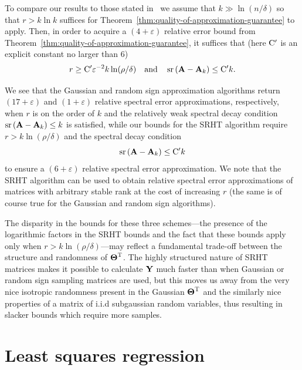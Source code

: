 To compare our results to those stated in~\cite{HMT,Zou10} we assume that $k \gg \ln(n/\delta)$ so that $r > k\ln k$ suffices for Theorem~\ref{thm:quality-of-approximation-guarantee} to apply.  Then, in order to acquire a $(4 + \varepsilon)$ relative error bound from Theorem~\ref{thm:quality-of-approximation-guarantee}, it suffices that
(here $\mathrm{C}^\prime$ is an explicit constant no larger than 6)
\[
 r \geq \mathrm{C}^\prime \varepsilon^{-2} k \ln(\rho/\delta) \quad \text{and}\quad \operatorname{sr}\left({\bm{\mathrm{A}}} - {\bm{\mathrm{A}}}_k\right) \leq \mathrm{C}^\prime k.
\]

We see that the Gaussian and random sign approximation algorithms return $(17+\varepsilon)$ and $(1+\varepsilon)$ relative spectral error approximations, respectively, when $r$ is on the order of $k$ and the relatively weak spectral decay condition $\operatorname{sr}\left({\bm{\mathrm{A}}} - {\bm{\mathrm{A}}}_k\right) \leq k$ is satisfied, while our bounds for the SRHT algorithm require $r > k \ln (\rho/\delta)$ and the spectral decay condition
$$\operatorname{sr}\left({\bm{\mathrm{A}}} - {\bm{\mathrm{A}}}_k\right) \leq \mathrm{C}^\prime k$$
to ensure a $(6 + \varepsilon)$ relative spectral error approximation. We note that the SRHT algorithm can be used to obtain relative spectral error approximations of matrices with arbitrary stable rank at the cost of increasing $r$ (the same is of course true for the Gaussian and random sign algorithms).

The disparity in the bounds for these three schemes---the presence of the logarithmic factors in the SRHT bounds and the fact that these bounds apply only when $r > k \ln(\rho/\delta)$---may reflect a fundamental trade-off between the structure and randomness of ${\bm{\mathrm{\Theta}}}^{\textsc{T}}$. The highly structured nature of SRHT matrices makes it possible to calculate ${\bm{\mathrm{Y}}}$ much faster than when Gaussian or random sign sampling matrices are used, but this moves us away from the very nice isotropic randomness present in the Gaussian ${\bm{\mathrm{\Theta}}}^{\textsc{T}}$ and the similarly nice properties of a matrix of i.i.d subgaussian random variables, thus resulting in slacker bounds which require more samples.

\section{Least squares regression}\label{sec:regression}

